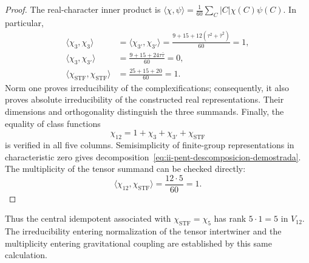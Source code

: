 \begin{proof}
The real-character inner product is
\(\langle\chi,\psi\rangle
=\frac1{60}\sum_C|C|\chi(C)\psi(C)\).
In particular,
\begin{align*}
 \langle\chi_3,\chi_3\rangle
 &=\langle\chi_{3'},\chi_{3'}\rangle
 =\frac{9+15+12(\tau^2+\bar\tau^2)}{60}=1,\\
 \langle\chi_3,\chi_{3'}\rangle
 &=\frac{9+15+24\tau\bar\tau}{60}=0,\\
 \langle\chi_{\mathrm{STF}},\chi_{\mathrm{STF}}\rangle
 &=\frac{25+15+20}{60}=1.
\end{align*}
Norm one proves irreducibility of the complexifications;
consequently, it also proves absolute irreducibility of the constructed
real representations. Their dimensions and orthogonality distinguish the
three summands. Finally, the equality of class functions
\[
 \chi_{12}=1+\chi_3+\chi_{3'}+\chi_{\mathrm{STF}}
\]
is verified in all five columns. Semisimplicity of finite-group
representations in characteristic zero gives
decomposition~\eqref{eq:ii-pent-descomposicion-demostrada}. The
multiplicity of the tensor summand can be checked directly:
\[
 \langle\chi_{12},\chi_{\mathrm{STF}}\rangle
 =\frac{12\cdot5}{60}=1.
\]
\end{proof}

Thus the central idempotent associated with
\(\chi_{\mathrm{STF}}=\chi_5\) has rank
\(5\cdot1=5\) in \(V_{12}\). The irreducibility entering
normalization of the tensor intertwiner and the multiplicity
entering gravitational coupling are established by
this same calculation.
